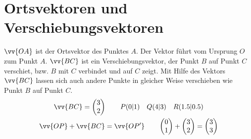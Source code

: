 \section{Ortsvektoren und Verschiebungsvektoren}
$\vv{OA}$ ist der Ortsvektor des Punktes $A$. Der Vektor führt vom Ursprung $O$ zum Punkt $A$. $\vv{BC}$ ist ein Verschiebungsvektor, der Punkt $B$ auf Punkt $C$ verschiet, bzw. $B$ mit $C$ verbindet und auf $C$ zeigt. Mit Hilfe des Vektors $\vv{BC}$ lassen sich auch andere Punkte in gleicher Weise verschieben wie Punkt $B$ auf Punkt $C$.
\begin{gather*}
  \vv{BC} = \begin{pmatrix} 3 \\ 2 \end{pmatrix} \qquad P(0|1) \quad Q(4|3) \quad R(1.5|0.5) \\
  \vv{OP} + \vv{BC} = \vv{OP'} \qquad \begin{pmatrix} 0 \\ 1 \end{pmatrix} + \begin{pmatrix} 3 \\ 2 \end{pmatrix} = \begin{pmatrix} 3 \\ 3 \end{pmatrix}
\end{gather*}
